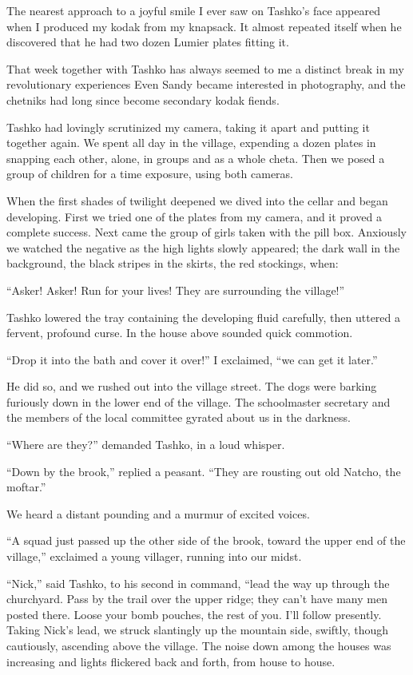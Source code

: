 \documentclass[a5paper,12pt]{book}
\begin{document}
The nearest approach to a joyful smile I ever saw on Tashko’s face appeared when I produced my kodak from my knapsack. It almost repeated itself when he discovered that he had two dozen Lumier plates fitting it.

That week together with Tashko has always seemed to me a distinct break in my revolutionary experiences Even Sandy became interested in photography, and the chetniks had long since become secondary kodak fiends.

Tashko had lovingly scrutinized my camera, taking it apart and putting it together again. We spent all day in the village, expending a dozen plates in snapping each other, alone, in groups and as a whole cheta. Then we posed a group of children for a time exposure, using both cameras.

When the first shades of twilight deepened we dived into the cellar and began developing. First we tried one of the plates from my camera, and it proved a complete success. Next came the group of girls taken with the pill box. Anxiously we watched the negative as the high lights slowly appeared; the dark wall in the background, the black stripes in the skirts, the red stockings, when:

“Asker! Asker! Run for your lives! They are surrounding the village!”

Tashko lowered the tray containing the developing fluid carefully, then uttered a fervent, profound curse. In the house above sounded quick commotion.

“Drop it into the bath and cover it over!” I exclaimed, “we can get it later.”

He did so, and we rushed out into the village street. The dogs were barking furiously down in the lower end of the village. The schoolmaster secretary and the members of the local committee gyrated about us in the darkness.

“Where are they?” demanded Tashko, in a loud whisper.

“Down by the brook,” replied a peasant. “They are rousting out old Natcho, the moftar.”

We heard a distant pounding and a murmur of excited voices.

“A squad just passed up the other side of the brook, toward the upper end of the village,” exclaimed a young villager, running into our midst.

“Nick,” said Tashko, to his second in command, “lead the way up through the churchyard. Pass by the trail over the upper ridge; they can’t have many men posted there. Loose your bomb pouches, the rest of you. I’ll follow presently.
Taking Nick's lead, we struck slantingly up the mountain side, swiftly, though cautiously, ascending above the village. The noise down among the houses was increasing and lights flickered back and forth, from house to house. 
\end{document}
